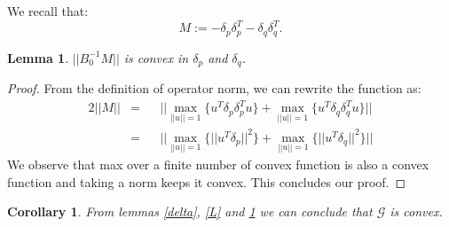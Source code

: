 \documentclass[11pt,twocolumn,varwidth=true,a4paper,fleqn]{article}
\newtheorem{lemma}{Lemma}
\newtheorem{corollary}{Corollary}
\begin{document}
We recall that:
\begin{equation*} 
M:= - \delta_p\delta_p^T - \delta_q\delta_q^T.
\end{equation*}
\begin{lemma} \label{M}
$||B_0^{-1}M||$ is convex in $\delta_p$
and $\delta_q$.
\end{lemma}
\begin{proof}
From the definition of operator norm, we can rewrite the function as:
\begin{alignat*} {2}
||M|| & = && ||\max_{||u||=1}{\{u^T \delta_p\delta_p^T u\}} +
\max_{||u||=1}{\{u^T \delta_q\delta_q^T u\}} ||\\
& = && ||\max_{||u||=1}{\{||u^T \delta_p||^2\}} + \max_{||u||=1}{\{||u^T
\delta_q||^2\}}||
\end{alignat*}
We observe that max over a finite number of convex function is also a convex
function and taking a norm keeps it convex. This concludes our proof.
\end{proof}

\begin{corollary}
From lemmas \ref{delta}, \ref{L} and \ref{M} we can conclude that $\mathcal{G}$
is convex.
\end{corollary}
\end{document}
